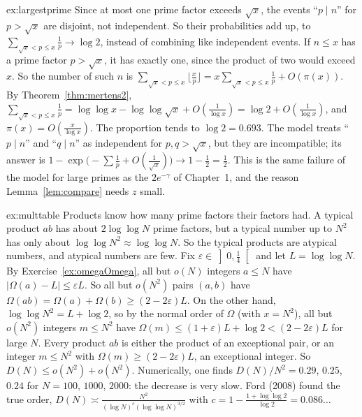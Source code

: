 \begin{solution}{ex:largestprime}
\idea Since at most one prime factor exceeds $\sqrt x$, the events ``$p\mid n$'' for $p>\sqrt x$ are disjoint, not independent. So their probabilities add up, to $\sum_{\sqrt x<p\le x}\frac1p\to\log2$, instead of combining
like independent events.
\writeup If $n\le x$ has a prime factor $p>\sqrt x$, it has exactly one, since the product of two would exceed $x$. So the number of such $n$ is $\sum_{\sqrt x<p\le x}\lfloor\frac xp\rfloor=x\sum_{\sqrt x<p\le x}\frac1p+O(\pi(x))$.
By Theorem~\ref{thm:mertens2}, $\sum_{\sqrt x<p\le x}\frac1p=\log\log x-\log\log\sqrt x+O(\frac1{\log x})=\log2+O(\frac1{\log x})$, and $\pi(x)=O(\frac x{\log x})$. The proportion tends to $\log2=0.693$. The model treats ``$p\mid n$'' and ``$q\mid n$'' as independent for $p,q>\sqrt x$, but they are
incompatible; its answer is $1-\exp\bigl(-\sum\frac1p+O(\frac1{\sqrt x})\bigr)\to1-\frac12=\frac12$. This is the same failure of the model for large primes as the $2e^{-\gamma}$ of Chapter~1, and the reason Lemma~\ref{lem:compare} needs $z$ small.
\end{solution}

\begin{solution}{ex:multtable}
\idea Products know how many prime factors their factors had. A typical product $ab$ has about $2\log\log N$ prime factors, but a typical number up to $N^2$ has only about $\log\log N^2\approx\log\log N$. So the typical products are
atypical numbers, and atypical numbers are few.
\writeup Fix $\varepsilon\in\left]0,\frac14\right[$ and let $L=\log\log N$. By Exercise~\ref{ex:omegaOmega}, all but $o(N)$ integers $a\le N$ have $|\Omega(a)-L|\le\varepsilon L$. So all but $o(N^2)$ pairs $(a,b)$ have
$\Omega(ab)=\Omega(a)+\Omega(b)\ge(2-2\varepsilon)L$. On the other hand, $\log\log N^2=L+\log2$, so by the normal order of $\Omega$ (with $x=N^2$), all but $o(N^2)$ integers $m\le N^2$ have $\Omega(m)\le(1+\varepsilon)L+\log2<(2-2\varepsilon)L$ for large $N$.
Every product $ab$ is either the product of an exceptional pair, or an integer $m\le N^2$ with $\Omega(m)\ge(2-2\varepsilon)L$, an exceptional integer. So $D(N)\le o(N^2)+o(N^2)$.
Numerically, one finds $D(N)/N^2=0.29$, $0.25$, $0.24$ for $N=100$, $1000$, $2000$: the decrease is very slow. Ford (2008) found the true order, $D(N)\asymp\frac{N^2}{(\log N)^c(\log\log N)^{3/2}}$ with $c=1-\frac{1+\log\log2}{\log2}=0.086\ldots$
\end{solution}

